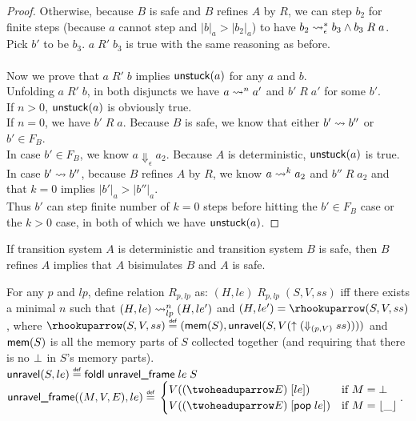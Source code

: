 \begin{proof}
  Otherwise, because $B$ is safe and $B$ refines $A$ by $R$, we can step $b_2$ for finite steps (because $a$ cannot step and $|b|_a>|b_2|_a$) to have $b_2\leadsto^*_\epsilon b_3\wedge b_3\;R\;a$. \\
  Pick $b'$ to be $b_3$. $a\;R'\;b_3$ is true with the same reasoning as before. \\
  \\
  Now we prove that $a\;R'\;b$ implies $\text{\textsf{unstuck}}(a)$ for any $a$ and $b$. \\
  Unfolding $a\;R'\;b$, in both disjuncts we have $a\leadsto^na'$ and $b'\;R\;a'$ for some $b'$. \\
  If $n>0$, $\text{\textsf{unstuck}}(a)$ is obviously true. \\
  If $n=0$, we have $b'\;R\;a$. Because $B$ is safe, we know that either $b'\leadsto b''$ or $b'\in F_B$. \\
  In case $b'\in F_B$, we know $a\Downarrow_\epsilon a_2$. Because $A$ is deterministic, $\text{\textsf{unstuck}}(a)$ is true. \\
  In case $b'\leadsto b''$, because $B$ refines $A$ by $R$, we know $a\leadsto^ka_2$ and $b''\;R\;a_2$ and that $k=0$ implies $|b'|_a>|b''|_a$. \\
  Thus $b'$ can step finite number of $k=0$ steps before hitting the $b'\in F_B$ case or the $k>0$ case, in both of which we have $\text{\textsf{unstuck}}(a)$.
\end{proof}

\begin{corollary} \label{coro-reverse}
  If transition system $A$ is deterministic and transition system $B$ is safe, then $B$ refines $A$ implies that $A$ bisimulates $B$ and $A$ is safe.
\end{corollary}

\begin{definition}[Relation $R$] \label{def-R}
  For any $p$ and $lp$, define relation $R_{p,lp}$ as: $(H, le)\;R_{p,lp}\;(S, V, ss)$ iff there exists a minimal $n$ such that $(H, le)\leadsto_{lp}^n(H, le')$ and $(H, le')=\ctolowc{(S, V, ss)}$, where $\ctolowc{(S, V, ss)}\defeq(\mem(S), \unravel(S, V(\ctolow{(\normal{ss}{(p,V)})})))$ and $\text{\textsf{mem}}(S)$ is all the memory parts of $S$ collected together (and requiring that there is no $\bot$ in $S$'s memory parts). \\
  $\unravel(S, le)\defeq\foldl\;\unravelframe\;le\;S$ \\
  $\unravelframe((M, V, E), le)\defeq \\ \begin{cases}
    V(\fplug{(\ctolowE{E})}{le}) & \text{if }M=\None\\
    V(\fplug{(\ctolowE{E})}{\epop\;le}) & \text{if }M=\Some{\_}
  \end{cases}$.
\end{definition}

